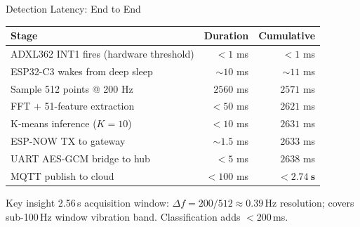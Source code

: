 \begin{frame}{Detection Latency: End to End}
\centering
\renewcommand{\arraystretch}{1.15}
\small
\begin{tabular}{l r r}
\toprule
\textbf{Stage} & \textbf{Duration} & \textbf{Cumulative} \\
\midrule
ADXL362 INT1 fires (hardware threshold) & $<1$ ms      & $<1$ ms     \\
ESP32-C3 wakes from deep sleep          & $\sim10$ ms  & $\sim11$ ms \\
Sample 512 points @ 200 Hz             & $2560$ ms    & $2571$ ms   \\
FFT + 51-feature extraction            & $<50$ ms     & $2621$ ms   \\
K-means inference ($K=10$)             & $<10$ ms     & $2631$ ms   \\
ESP-NOW TX to gateway                  & $\sim1.5$ ms & $2633$ ms   \\
UART AES-GCM bridge to hub             & $<5$ ms      & $2638$ ms   \\
MQTT publish to cloud                  & $<100$ ms    & $\mathbf{<2.74\ s}$ \\
\bottomrule
\end{tabular}

\vspace{0.3em}
\normalsize
\begin{block}{Key insight}
  2.56\,s acquisition window: $\Delta f = 200/512 \approx 0.39$\,Hz resolution; covers sub-100\,Hz window vibration band. Classification adds $<200$\,ms.
\end{block}
\end{frame}
